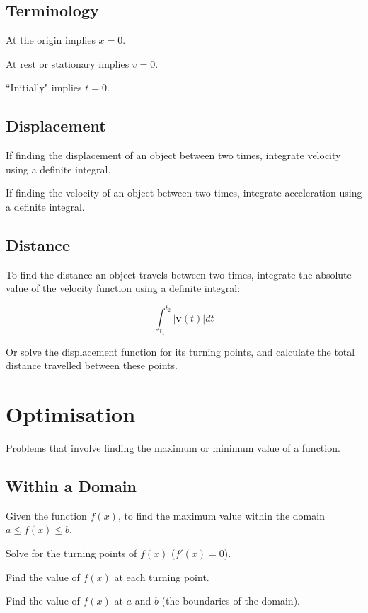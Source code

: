 \documentclass[a4paper,11pt]{article}
\newcommand{\bb}{\boldsymbol}
\begin{document}
\subsection{Terminology}

At the origin implies $x = 0$.

At rest or stationary implies $v = 0$.

``Initially" implies $t = 0$.


\subsection{Displacement}

If finding the displacement of an object between two times, integrate velocity
using a definite integral.

If finding the velocity of an object between two times, integrate acceleration
using a definite integral.


\subsection{Distance}

To find the distance an object travels between two times, integrate the absolute
value of the velocity function using a definite integral:

$$
\int_{t_1}^{t_2} \lvert \bb{v}(t) \rvert dt
$$

Or solve the displacement function for its turning points, and calculate the
total distance travelled between these points.




\section{Optimisation}

Problems that involve finding the maximum or minimum value of a function.


\subsection{Within a Domain}

Given the function $f(x)$, to find the maximum value within the domain
$a \leq f(x) \leq b$.

Solve for the turning points of $f(x)$ ($f'(x) = 0$).

Find the value of $f(x)$ at each turning point.

Find the value of $f(x)$ at $a$ and $b$ (the boundaries of the domain).
\end{document}
